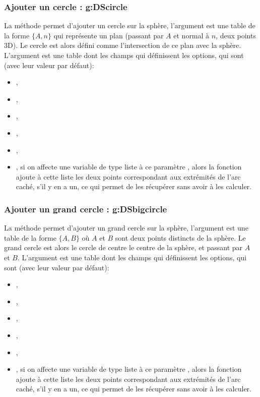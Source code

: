 \subsubsection{Ajouter un cercle : g:DScircle}
\def\writeoptions{L'argument \argu{options} est une table dont les champs qui définissent les options, qui sont (avec leur valeur par défaut)}%

La méthode  permet d'ajouter un cercle sur la sphère, l'argument  est une table de la forme $\{A,n\}$ qui représente un plan (passant par $A$ et normal à $n$, deux points 3D). Le cercle est alors défini comme l'intersection de ce plan avec la sphère. \writeoptions :
    \begin{itemize}
        \item {}, 
        \item {},
        \item {},
        \item {},
        \item {},
        \item {}, si on affecte une variable de type liste à ce paramètre , alors la fonction ajoute à cette liste les deux points correspondant aux extrémités de l'arc caché, s'il y en a un, ce qui permet de les récupérer sans avoir à les calculer.
    \end{itemize}
    
\subsubsection{Ajouter un grand cercle : g:DSbigcircle}

La méthode  permet d'ajouter un grand cercle sur la sphère, l'argument  est une table de la forme $\{A,B\}$ où $A$ et $B$ sont deux points distincts de la sphère. Le grand cercle est alors le cercle de centre le centre de la sphère, et passant par $A$ et $B$. \writeoptions :
    \begin{itemize}
        \item {}, 
        \item {},
        \item {},
        \item {},
        \item {},
        \item {}, si on affecte une variable de type liste à ce paramètre , alors la fonction ajoute à cette liste les deux points correspondant aux extrémités de l'arc caché, s'il y en a un, ce qui permet de les récupérer sans avoir à les calculer.
    \end{itemize}
    

